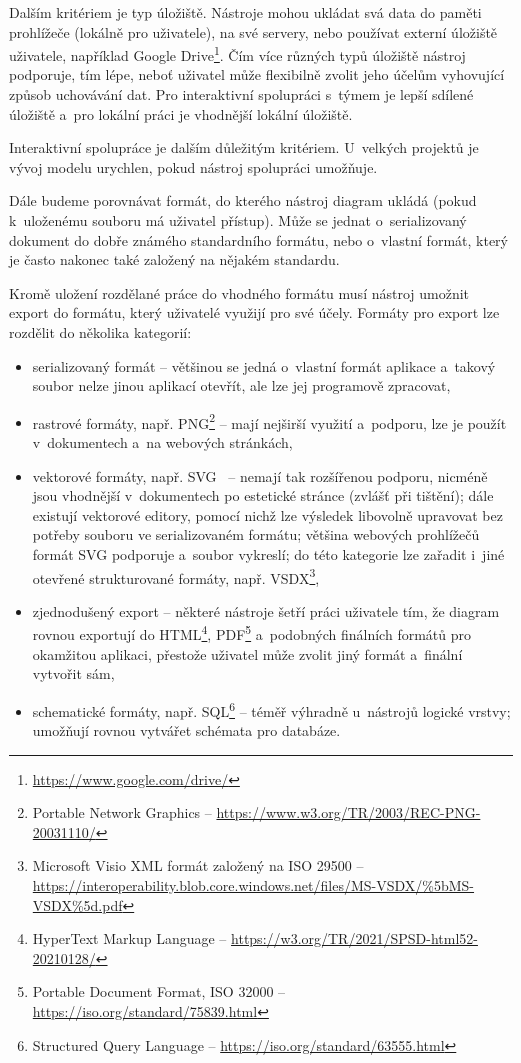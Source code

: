 Dalším kritériem je typ úložiště.
Nástroje mohou ukládat svá data do paměti prohlížeče (lokálně pro uživatele), na své servery, nebo používat externí úložiště uživatele, například Google Drive\footnote{\url{https://www.google.com/drive/}}.
Čím více různých typů úložiště nástroj podporuje, tím lépe, neboť uživatel může flexibilně zvolit jeho účelům vyhovující způsob uchovávání dat.
Pro interaktivní spolupráci s~týmem je lepší sdílené úložiště a~pro lokální práci je vhodnější lokální úložiště.

Interaktivní spolupráce je dalším důležitým kritériem.
U~velkých projektů je vývoj modelu urychlen, pokud nástroj spolupráci umožňuje.

Dále budeme porovnávat formát, do kterého nástroj diagram ukládá (pokud k~uloženému souboru má uživatel přístup).
Může se jednat o~serializovaný dokument do dobře známého standardního formátu, nebo o~vlastní formát, který je často nakonec také založený na nějakém standardu.

Kromě uložení rozdělané práce do vhodného formátu musí nástroj umožnit export do formátu, který uživatelé využijí pro své účely.
Formáty pro export lze rozdělit do několika kategorií:
\begin{itemize}
  \item serializovaný formát -- většinou se jedná o~vlastní formát aplikace a~takový soubor nelze jinou aplikací otevřít, ale lze jej programově zpracovat,
  \item rastrové formáty, např. PNG\footnote{Portable Network Graphics -- \url{https://www.w3.org/TR/2003/REC-PNG-20031110/}} -- mají nejširší využití a~podporu, lze je použít v~dokumentech a~na webových stránkách,
  \item vektorové formáty, např. SVG~\cite{Dirk18} -- nemají tak rozšířenou podporu, nicméně jsou vhodnější v~dokumentech po estetické stránce (zvlášť při tištění);
        dále existují vektorové editory, pomocí nichž lze výsledek libovolně upravovat bez potřeby souboru ve serializovaném formátu;
        většina webových prohlížečů formát SVG podporuje a~soubor vykreslí;
        do této kategorie lze zařadit i~jiné otevřené strukturované formáty, např. VSDX\footnote{Microsoft Visio XML formát založený na ISO 29500 -- \url{https://interoperability.blob.core.windows.net/files/MS-VSDX/\%5bMS-VSDX\%5d.pdf}},
  \item zjednodušený export -- některé nástroje šetří práci uživatele tím, že diagram rovnou exportují do HTML\footnote{HyperText Markup Language -- \url{https://w3.org/TR/2021/SPSD-html52-20210128/}}, PDF\footnote{Portable Document Format, ISO 32000 -- \url{https://iso.org/standard/75839.html}} a~podobných finálních formátů pro okamžitou aplikaci, přestože uživatel může zvolit jiný formát a~finální vytvořit sám,
  \item schematické formáty, např. SQL\footnote{Structured Query Language -- \url{https://iso.org/standard/63555.html}} -- téměř výhradně u~nástrojů lo\-gic\-ké vrst\-vy; umožňují rovnou vytvářet schémata pro databáze.
\end{itemize}

